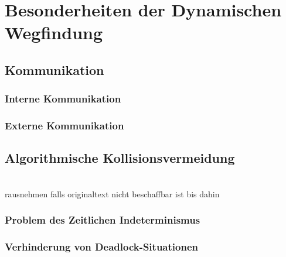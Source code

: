 \chapter{Besonderheiten der Dynamischen Wegfindung}

\section{Kommunikation}
	\label{Kommunikation}
\subsection{Interne Kommunikation}
	\label{Interne Kommunikation}
\subsection{Externe Kommunikation}

\section{Algorithmische Kollisionsvermeidung}
	\label{Kollisionsvermeidung}
\cite{Silver2005}
\\
\cite{Zelinsky1992}rausnehmen falls originaltext nicht beschaffbar ist bis dahin

\subsection{Problem des Zeitlichen Indeterminismus}

\cite{Erdmann1986}
\subsection{Verhinderung von Deadlock-Situationen}

